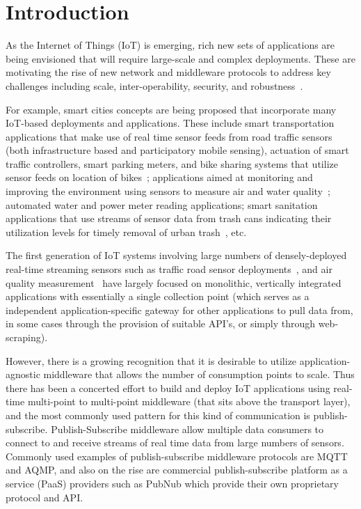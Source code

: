 \section{Introduction}
\label{sec:intro}

As the Internet of Things (IoT) is emerging, rich new sets of applications are being envisioned that will require large-scale and complex deployments. These are motivating the rise of new network and middleware protocols to address 
key challenges including scale, inter-operability, security, and robustness~\cite{}. 

For example, smart cities concepts are being proposed that incorporate many IoT-based deployments and applications. These include smart transportation applications that make use of real time sensor feeds from road traffic sensors (both infrastructure based and participatory mobile sensing), actuation of smart traffic controllers, smart parking meters, and bike sharing systems that utilize sensor feeds on location of bikes~\cite{}; applications aimed at monitoring and improving the environment using sensors to measure air and water quality~\cite{}; automated water and power meter reading applications; smart sanitation applications that use streams of sensor data from trash cans indicating their utilization levels for timely removal of urban trash~\cite{}, etc. 

The first generation of IoT systems involving large numbers of densely-deployed real-time streaming sensors such as traffic road sensor deployments~\cite{}, and air quality measurement~\cite{} have largely focused on monolithic, vertically integrated applications with essentially a single collection point (which serves as a independent application-specific gateway for other applications to pull data from, in some cases through the provision of suitable API's, or simply through web-scraping). 

However, there is a growing recognition that it is desirable to utilize application-agnostic middleware that allows the number of consumption points to scale. Thus there has been a concerted effort to build and deploy IoT applications using real-time multi-point to multi-point middleware (that sits above the transport layer), and the most commonly used pattern for this kind of communication is publish-subscribe. Publish-Subscribe middleware allow multiple data consumers to connect to and receive streams of real time data from large numbers of sensors. Commonly used examples of publish-subscribe middleware protocols are MQTT and AQMP, and also on the rise are commercial publish-subscribe platform as a service (PaaS) providers such as PubNub which provide their own proprietary protocol and API.  

